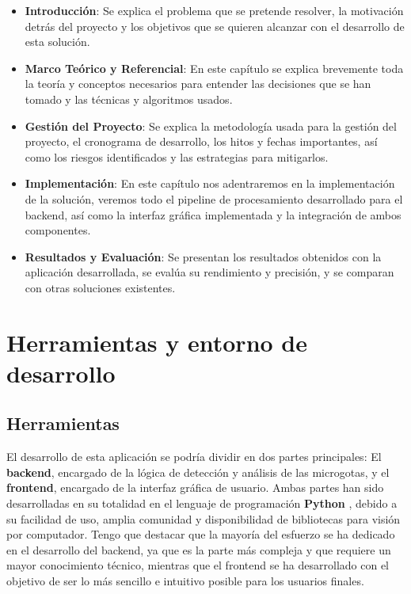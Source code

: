 \begin{itemize}
    \item \textbf{Introducción}: Se explica el problema que se pretende resolver, la motivación detrás del proyecto y los objetivos que se quieren alcanzar con el desarrollo de esta solución.
    \item \textbf{Marco Teórico y Referencial}: En este capítulo se explica brevemente toda la teoría y conceptos necesarios para entender las decisiones que se han tomado y las técnicas y algoritmos usados.
    \item \textbf{Gestión del Proyecto}: Se explica la metodología usada para la gestión del proyecto, el cronograma de desarrollo, los hitos y fechas importantes, así como los riesgos identificados y las estrategias para mitigarlos.
    \item \textbf{Implementación}: En este capítulo nos adentraremos en la implementación de la solución, veremos todo el pipeline de procesamiento desarrollado para el backend, así como la interfaz gráfica implementada y la integración de ambos componentes.
    \item \textbf{Resultados y Evaluación}: Se presentan los resultados obtenidos con la aplicación desarrollada, se evalúa su rendimiento y precisión, y se comparan con otras soluciones existentes.
\end{itemize}

\section{Herramientas y entorno de desarrollo}

\subsection{Herramientas}

El desarrollo de esta aplicación se podría dividir en dos partes principales: El \textbf{backend}, encargado de la lógica de detección y análisis de las microgotas, y el \textbf{frontend}, encargado de la interfaz gráfica de usuario. Ambas partes han sido desarrolladas en su totalidad en el lenguaje de programación \textbf{Python} \cite{python_psf}, debido a su facilidad de uso, amplia comunidad y disponibilidad de bibliotecas para visión por computador. Tengo que destacar que la mayoría del esfuerzo se ha dedicado en el desarrollo del backend, ya que es la parte más compleja y que requiere un mayor conocimiento técnico, mientras que el frontend se ha desarrollado con el objetivo de ser lo más sencillo e intuitivo posible para los usuarios finales.

